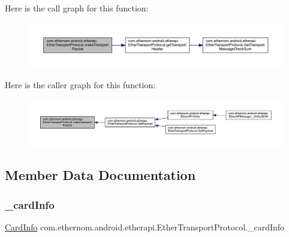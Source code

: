 Here is the call graph for this function\+:\nopagebreak
\begin{figure}[H]
\begin{center}
\leavevmode
\includegraphics[width=350pt]{classcom_1_1ethernom_1_1android_1_1etherapi_1_1_ether_transport_protocol_a0d8874e2def3ca2e1372409470124bae_cgraph}
\end{center}
\end{figure}
Here is the caller graph for this function\+:
\nopagebreak
\begin{figure}[H]
\begin{center}
\leavevmode
\includegraphics[width=350pt]{classcom_1_1ethernom_1_1android_1_1etherapi_1_1_ether_transport_protocol_a0d8874e2def3ca2e1372409470124bae_icgraph}
\end{center}
\end{figure}


\subsection{Member Data Documentation}
\mbox{\label{classcom_1_1ethernom_1_1android_1_1etherapi_1_1_ether_transport_protocol_a8ad30f5f02ad20c0f5864edf2d3e5b88}} 
\subsubsection{\texorpdfstring{\+\_\+card\+Info}{\_cardInfo}}
{\footnotesize\ttfamily \mbox{\hyperlink{classcom_1_1ethernom_1_1android_1_1etherapi_1_1_card_info}{Card\+Info}} com.\+ethernom.\+android.\+etherapi.\+Ether\+Transport\+Protocol.\+\_\+card\+Info\hspace{0.3cm}{\ttfamily [private]}}



